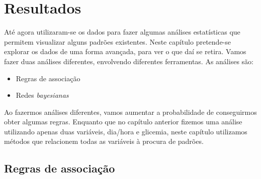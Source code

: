 \chapter{Resultados}\label{chap:results}

Até agora utilizaram-se os dados para fazer algumas análises estatísticas que permitem visualizar alguns padrões existentes. Neste capítulo pretende-se explorar os dados de uma forma avançada, para ver o que daí se retira. Vamos fazer duas análises diferentes, envolvendo diferentes ferramentas. As análises são:

\begin{itemize}
\item Regras de associação
\item Redes \textit{bayesianas}
\end{itemize}

Ao fazermos análises diferentes, vamos aumentar a probabilidade de conseguirmos obter algumas regras. Enquanto que no capítulo anterior fizemos uma análise utilizando apenas duas variáveis, dia/hora e glicemia, neste capítulo utilizamos métodos que relacionem todas as variáveis à procura de padrões.


\section{Regras de associação}\label{sec:regras}

